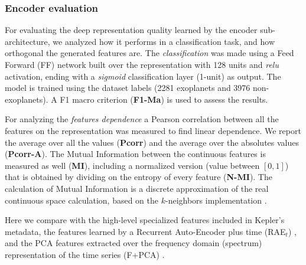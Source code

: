 \subsubsection*{Encoder evaluation} %
For evaluating the deep representation quality learned by the encoder sub-architecture, we analyzed how it performs in a classification task, and how orthogonal the generated features are.
The \textit{classification} was made using a Feed Forward (FF) network built over the representation with 128 units and \textit{relu} activation, ending with a \textit{sigmoid} classification layer (1-unit) as output. The model is trained using the dataset labels (2281 exoplanets and 3976 non-exoplanets). A F1 macro criterion (\textbf{F1-Ma}) is used to assess the results. 

For analyzing the \textit{features dependence} a Pearson correlation between all the features on the representation was measured to find linear dependence. We report the average over all the values (\textbf{Pcorr}) and the average over the absolutes values (\textbf{Pcorr-A}).  
The Mutual Information between the continuous features is measured as well (\textbf{MI}), including a normalized version (value between $[0,1]$) that is obtained by dividing on the entropy of every feature (\textbf{N-MI}). The calculation of Mutual Information is a discrete approximation of the real continuous space calculation, based on the $k$-neighbors implementation \citep{ross2014mutual}.

Here we compare with the high-level specialized features included in Kepler's metadata, the features learned by a Recurrent Auto-Encoder plus time (RAE$_t$) \citep{naul2018recurrent}, and the PCA features extracted over the frequency domain (spectrum) representation of the time series (F+PCA) \citep{bugueno2018refining}. 


